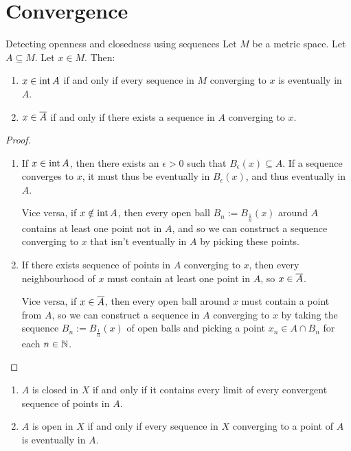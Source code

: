 \section{Convergence}
\begin{importanttheorem}{Detecting openness and closedness using sequences}{}
	Let $M$ be a metric space. Let $A \subseteq M$. Let $x \in M$. Then:
	\begin{enumerate}
		\item $x \in \operatorname{int} A$ if and only if every sequence in $M$ converging to $x$ is eventually in $A$.
		\item $x \in \overline{{A}}$ if and only if there exists a sequence in $A$ converging to $x$.
	\end{enumerate}
\end{importanttheorem}
\begin{proof}
	\begin{enumerate}
		\item If $x \in \operatorname{int} A$, then there exists an $\epsilon > 0$ such that $B_\epsilon(x) \subseteq A$. If a sequence converges to $x$, it must thus be eventually in $B_\epsilon(x)$, and thus eventually in $A$. 
		
		Vice versa, if $x \notin \operatorname{int} A$, then every open ball $B_n := B_\frac{1}{n}(x)$ around $A$ contains at least one point not in $A$, and so we can construct a sequence converging to $x$ that isn't eventually in $A$ by picking these points.
		\item If there exists sequence of points in $A$ converging to $x$, then every neighbourhood of $x$ must contain at least one point in $A$, so $x \in \overline{{A}}$. 
		
		Vice versa, if $x \in \overline{{A}}$, then every open ball around $x$ must contain a point from $A$, so we can construct a sequence in $A$ converging to $x$ by taking the sequence $B_n := B_\frac{1}{n}(x)$ of open balls and picking a point $x_n \in A \cap B_n$ for each $n \in \mathbb{N}$.
	\end{enumerate}
\end{proof}
\begin{corollary}
	\hphantom{}
	\begin{enumerate}
		\item $A$ is closed in $X$ if and only if it contains every limit of every convergent sequence of points in $A$.
		\item $A$ is open in $X$ if and only if every sequence in $X$ converging to a point of $A$ is eventually in $A$.
	\end{enumerate}
\end{corollary}
\clearpage

